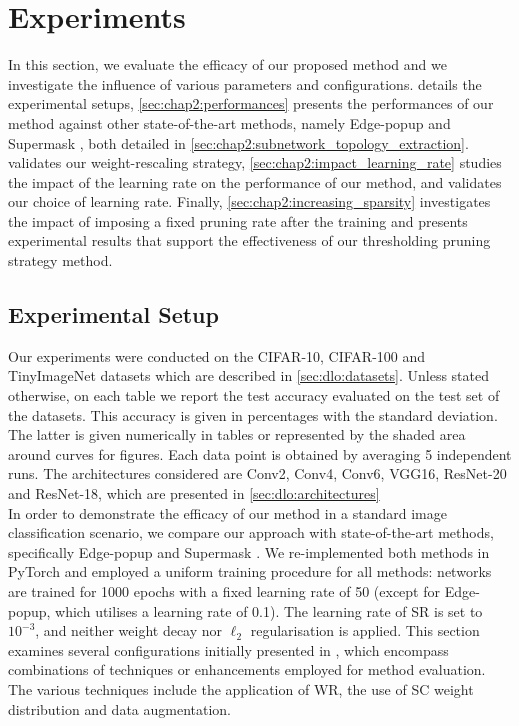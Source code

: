 \section{Experiments}
\label{sec:chap2:experiments}

In this section, we  evaluate the efficacy of our proposed method and we
investigate the influence of various parameters and configurations.
 details the experimental setups,
\cref{sec:chap2:performances} presents the performances of our method against
other state-of-the-art methods, namely Edge-popup
\cite{DBLP:conf/cvpr/RamanujanWKFR20} and Supermask
\cite{DBLP:conf/nips/ZhouLLY19}, both detailed in
\cref{sec:chap2:subnetwork_topology_extraction}.
 validates our weight-rescaling
strategy,  \cref{sec:chap2:impact_learning_rate} studies the impact of the
learning rate on the performance of our method, and validates our choice of
learning rate. Finally, \cref{sec:chap2:increasing_sparsity} investigates the
impact of imposing a fixed pruning rate after the training and presents
experimental results that support the effectiveness of our thresholding pruning
strategy method.


\subsection{Experimental Setup}
\label{sec:chap2:experimental_setup}

Our experiments were conducted on the CIFAR-10, CIFAR-100 and TinyImageNet
datasets which are described in \cref{sec:dlo:datasets}. Unless stated
otherwise, on each table we report the test accuracy evaluated on the test set
of the datasets. This accuracy is given in percentages with the standard
deviation. The latter is given numerically in tables or represented by the
shaded area around curves for figures. Each data point is obtained by averaging
5 independent runs. The architectures considered are Conv2, Conv4, Conv6, VGG16,
ResNet-20 and ResNet-18, which are presented in \cref{sec:dlo:architectures}\\

In order to demonstrate the efficacy of our method in a standard image
classification scenario, we compare our approach with state-of-the-art methods,
specifically Edge-popup \cite{DBLP:conf/cvpr/RamanujanWKFR20} and Supermask
\cite{DBLP:conf/nips/ZhouLLY19}. We re-implemented both methods in PyTorch
\cite{DBLP:conf/nips/PaszkeGMLBCKLGA19} and employed a uniform training
procedure for all methods: networks are trained for 1000 epochs with a fixed
learning rate of 50 (except for Edge-popup, which utilises a learning rate of
0.1). The learning rate of \ac{SR} is set to $10^{-3}$, and  neither weight
decay nor $\ell_2$ regularisation is applied. This section examines several
configurations initially presented in \cite{DBLP:conf/nips/ZhouLLY19}, which
encompass combinations of techniques or enhancements employed for method
evaluation. The various techniques include the application of \ac{WR}, the use
of \ac{SC} weight distribution
\cite{DBLP:conf/nips/ZhouLLY19,DBLP:conf/cvpr/RamanujanWKFR20} and data
augmentation.\\

